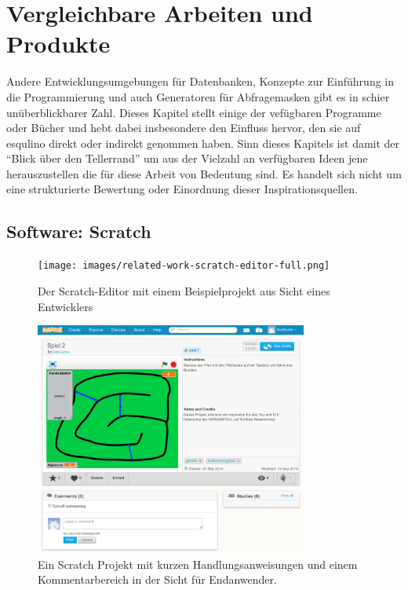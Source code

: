 \section{Vergleichbare Arbeiten und Produkte}
\label{sec:related-work}

Andere Entwicklungsumgebungen für Datenbanken, Konzepte zur Einführung in die Programmierung und auch Generatoren für Abfragemasken gibt es in schier unüberblickbarer Zahl. Dieses Kapitel stellt einige der vefügbaren Programme oder Bücher und hebt dabei insbesondere den Einfluss hervor, den sie auf esqulino direkt oder indirekt genommen haben. Sinn dieses Kapitels ist damit der "`Blick über den Tellerrand"' um aus der Vielzahl an verfügbaren Ideen jene herauszustellen die für diese Arbeit von Bedeutung sind. Es handelt sich nicht um eine strukturierte Bewertung oder Einordnung dieser Inspirationsquellen.

\newpage

\subsection{Software: Scratch}

\begin{figure}[p]
  \centering \texttt{[image: images/related-work-scratch-editor-full.png]}
  \caption{Der Scratch-Editor mit einem Beispielprojekt aus Sicht eines Entwicklers}
  \label{fig:scratch-editor-full}
\end{figure}

\begin{figure}[p]
  \centering \includegraphics[width=0.8\textwidth]{images/related-work-scratch-project-full.png}
  \caption{Ein Scratch Projekt mit kurzen Handlungsanweisungen und einem Kommentarbereich in der Sicht für Endanwender.}
  \label{fig:scratch-enduser-full}
\end{figure}

